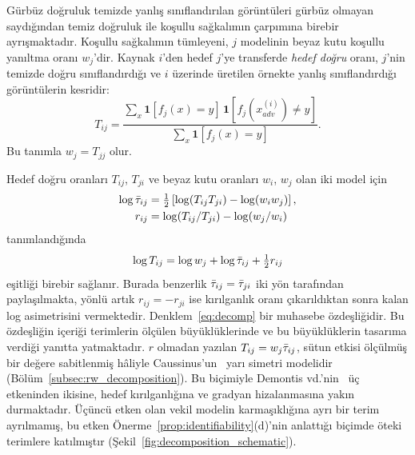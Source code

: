 Gürbüz doğruluk temizde yanlış sınıflandırılan görüntüleri gürbüz olmayan saydığından temiz doğruluk ile koşullu sağkalımın çarpımına birebir ayrışmaktadır. Koşullu sağkalımın tümleyeni, $j$ modelinin beyaz kutu koşullu yanıltma oranı $w_j$'dir. Kaynak $i$'den hedef $j$'ye transferde \emph{hedef doğru} oranı, $j$'nin temizde doğru sınıflandırdığı ve $i$ üzerinde üretilen örnekte yanlış sınıflandırdığı görüntülerin kesridir:
\begin{equation}
    T_{ij} = \frac{\sum_{x} \mathbf{1}[f_j(x) = y]\,\mathbf{1}[f_j(x_{adv}^{(i)}) \neq y]}{\sum_{x} \mathbf{1}[f_j(x) = y]}.
\end{equation}
Bu tanımla $w_j = T_{jj}$ olur.

Hedef doğru oranları $T_{ij}$, $T_{ji}$ ve beyaz kutu oranları $w_i$, $w_j$ olan iki model için
\begin{align}
\log\bar{\tau}_{ij} &= \tfrac12\left[\log(T_{ij}T_{ji}) - \log(w_i w_j)\right], \label{eq:tau_def}\\
r_{ij} &= \log(T_{ij}/T_{ji}) - \log(w_j/w_i) \label{eq:r_def}
\end{align}
tanımlandığında
\begin{equation}
\log T_{ij} = \log w_j + \log\bar{\tau}_{ij} + \tfrac12 r_{ij}
\label{eq:decomp}
\end{equation}
eşitliği birebir sağlanır. Burada benzerlik $\bar{\tau}_{ij} = \bar{\tau}_{ji}$ iki yön tarafından paylaşılmakta, yönlü artık $r_{ij} = -r_{ji}$ ise kırılganlık oranı çıkarıldıktan sonra kalan log asimetrisini vermektedir. Denklem~\eqref{eq:decomp} bir muhasebe özdeşliğidir. Bu özdeşliğin içeriği terimlerin ölçülen büyüklüklerinde ve bu büyüklüklerin tasarıma verdiği yanıtta yatmaktadır. $r$ olmadan yazılan $T_{ij} = w_j\bar{\tau}_{ij}$, sütun etkisi ölçülmüş bir değere sabitlenmiş hâliyle Caussinus'un~\cite{caussinus1965contribution} yarı simetri modelidir (Bölüm~\ref{subsec:rw_decomposition}). Bu biçimiyle Demontis vd.'nin~\cite{demontis2019adversarial} üç etkeninden ikisine, hedef kırılganlığına ve gradyan hizalanmasına yakın durmaktadır. Üçüncü etken olan vekil modelin karmaşıklığına ayrı bir terim ayrılmamış, bu etken Önerme~\ref{prop:identifiability}(d)'nin anlattığı biçimde öteki terimlere katılmıştır (Şekil~\ref{fig:decomposition_schematic}).

